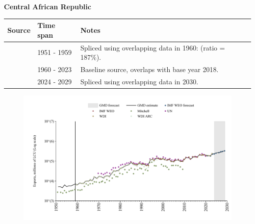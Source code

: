 \documentclass[12pt,a4paper,landscape]{article}
\begin{document}
\begin{adjustbox}{max totalsize={\paperwidth}{\paperheight},center}
\begin{minipage}[t][\textheight][t]{\textwidth}
\vspace*{0.5cm}
{}
\begin{center}
{\Large\bfseries Central African Republic}
\end{center}
\vspace{0.5cm}
\begin{table}[H]
\centering
\small
\begin{tabular}{|l|l|l|}
\hline
\textbf{Source} & \textbf{Time span} & \textbf{Notes} \\
\hline
\rowcolor{white}\cite{Mitchell}& 1951 - 1959 &Spliced using overlapping data in 1960: (ratio = 187\%).\\
\rowcolor{lightgray}\cite{WDI}& 1960 - 2023 &Baseline source, overlaps with base year 2018.\\
\rowcolor{white}\cite{IMF_WEO_forecast}& 2024 - 2029 &Spliced using overlapping data in 2030.\\
\hline
\end{tabular}
\end{table}
\begin{figure}[H]
\centering
\includegraphics[width=\textwidth,height=0.6\textheight,keepaspectratio]{graphs/CAF_exports.pdf}
\end{figure}
\end{minipage}
\end{adjustbox}
\end{document}
